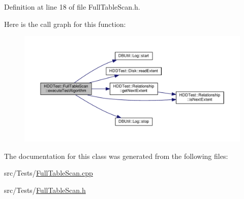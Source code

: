 Definition at line 18 of file Full\-Table\-Scan.\-h.



Here is the call graph for this function\-:
\nopagebreak
\begin{figure}[H]
\begin{center}
\leavevmode
\includegraphics[width=350pt]{class_h_d_d_test_1_1_full_table_scan_a732473e7440538517ab2c1f6e9e636eb_cgraph}
\end{center}
\end{figure}




The documentation for this class was generated from the following files\-:\begin{DoxyCompactItemize}
\item 
src/\-Tests/\hyperlink{_full_table_scan_8cpp}{Full\-Table\-Scan.\-cpp}\item 
src/\-Tests/\hyperlink{_full_table_scan_8h}{Full\-Table\-Scan.\-h}\end{DoxyCompactItemize}
